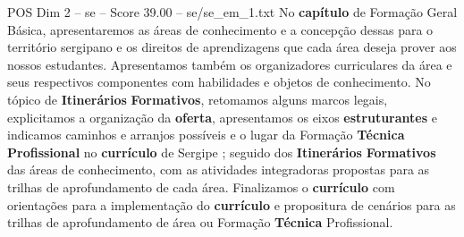 \begin{textsample}{POS Dim 2 – se – Score 39.00 – se/se\_em\_1.txt}
No \textbf{capítulo} de Formação Geral Básica, apresentaremos as áreas de conhecimento e a concepção dessas para o território sergipano e os direitos de aprendizagens que cada área deseja prover aos nossos estudantes.
Apresentamos também os organizadores curriculares da área e seus respectivos componentes com habilidades e objetos de conhecimento.
No tópico de \textbf{Itinerários} \textbf{Formativos}, retomamos alguns marcos legais, explicitamos a organização da \textbf{oferta}, apresentamos os eixos \textbf{estruturantes} e indicamos caminhos e arranjos possíveis e o lugar da Formação \textbf{Técnica} \textbf{Profissional} no \textbf{currículo} de Sergipe ; seguido dos \textbf{Itinerários} \textbf{Formativos} das áreas de conhecimento, com as atividades integradoras propostas para as trilhas de aprofundamento de cada área.
Finalizamos o \textbf{currículo} com orientações para a implementação do \textbf{currículo} e propositura de cenários para as trilhas de aprofundamento de área ou Formação \textbf{Técnica} Profissional.

\end{textsample}
